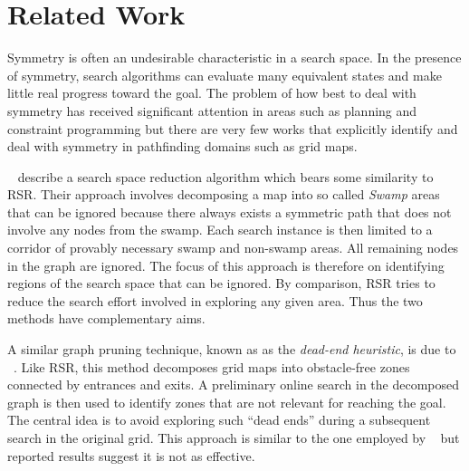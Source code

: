 \section{Related Work}
\label{sec:relatedwork}
Symmetry is often an undesirable characteristic in a search space.
In the presence of symmetry, search algorithms can evaluate many equivalent
states and make little real progress toward the goal.
The problem of how best to deal with symmetry has received significant attention 
in areas such as planning \cite{fox99} and constraint programming \cite{gent00} 
but there are very few works that explicitly identify and deal with symmetry in 
pathfinding domains such as grid maps. 
\par
\citeauthor{pochter10}~ describe a search space reduction
algorithm which bears some similarity to RSR.  Their approach involves
decomposing a map into so called \emph{Swamp} areas that can be ignored because
there always exists a symmetric path that does not involve any nodes from the swamp.
Each search instance is then limited to a corridor of provably necessary swamp
and non-swamp areas. All remaining nodes in the graph are ignored. 
The focus of this approach is therefore on 
identifying regions of the search space that can be ignored.  By comparison, RSR
tries to reduce the search effort involved in exploring any given area. Thus the
two methods have complementary aims.
\par
A similar graph pruning technique, known as as the \emph{dead-end heuristic}, is
due to \citeauthor{bjornsson06}~.  Like RSR, this method
decomposes grid maps into obstacle-free zones connected by entrances and exits.
A preliminary online search in the decomposed graph is then used to identify
zones that are not relevant for reaching the goal.  The central idea is to avoid
exploring such ``dead ends'' during a subsequent search in the original grid.
This approach is similar to the one employed by
\citeauthor{pochter10}~ but reported results suggest it is
not as effective.

